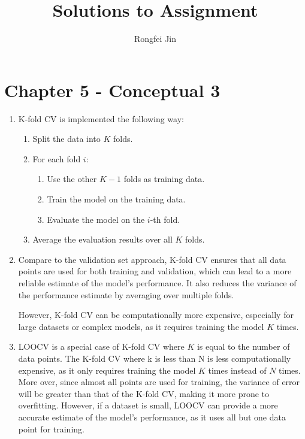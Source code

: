 \documentclass{article}
\title{Solutions to Assignment }
\author{Rongfei Jin}
\begin{document}
\pagestyle{fancy}
\fancyhf{}%
\fancyfoot[C]{\thepage}%
\maketitle
\newpage

\section{Chapter 5 - Conceptual 3}

\begin{enumerate}[label=(\alph*)]


\item
K-fold CV is implemented the following way:
\begin{enumerate}
    \item Split the data into $K$ folds.
    \item For each fold $i$:
    \begin{enumerate}
        \item Use the other $K-1$ folds as training data.
        \item Train the model on the training data.
        \item Evaluate the model on the $i$-th fold.
    \end{enumerate}
    \item Average the evaluation results over all $K$ folds.
\end{enumerate}

\item Compare to the validation set approach, K-fold CV ensures that all data points are used for both training and validation, which can lead to a more reliable estimate of the model's performance. It also reduces the variance of the performance estimate by averaging over multiple folds. 

However, K-fold CV can be computationally more expensive, especially for large datasets or complex models, as it requires training the model $K$ times.

\item  LOOCV is a special case of K-fold CV where $K$ is equal to the number of data points. The K-fold CV where k is less than N is less computationally expensive, as it only requires training the model $K$ times instead of $N$ times. More over, since almost all points are used for training, the variance of error will be greater than that of the K-fold CV, making it more prone to overfitting.  However, if a dataset is small, LOOCV can provide a more accurate estimate of the model's performance, as it uses all but one data point for training.
\end{enumerate}
\end{document}
